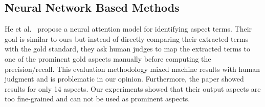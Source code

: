 \subsection{Neural Network Based Methods}
He et al.~  propose a neural attention model 
for identifying aspect terms. Their goal is similar to ours but instead of
directly comparing their extracted terms with the gold standard, they ask
human judges to map the extracted terms to one of the prominent gold 
aspects manually before computing the precision/recall. This evaluation 
methodology mixed machine results with human judgment and is problematic
in our opinion. Furthermore, the paper showed results for only 14 aspects.
Our experiments showed that their output aspects are too fine-grained and 
can not be used as prominent aspects.
%

